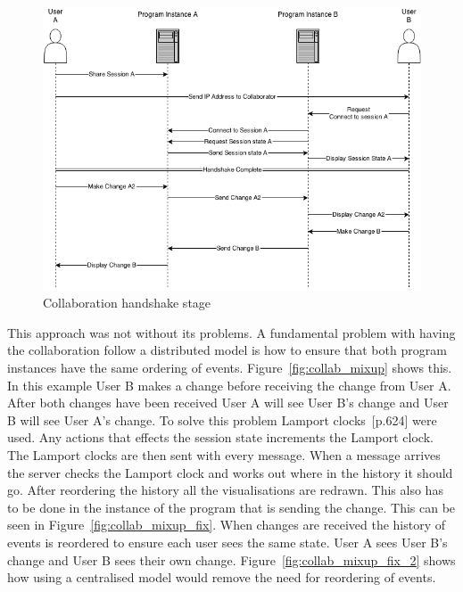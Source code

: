 \begin{figure}[h!]
    \centering
    \includegraphics[width=\textwidth]{images/minf_collab_diagram.png}
    \caption{Collaboration handshake stage}
    \label{fig:collab_handshake}
\end{figure}

This approach was not without its problems.  A fundamental problem with having the collaboration follow a distributed model is how to ensure that both program instances have the same ordering of events.  Figure~\ref{fig:collab_mixup} shows this.  In this example User B makes a change before receiving the change from User A.  After both changes have been received User A will see User B's change and User B will see User A's change.  To solve this problem Lamport clocks~\cite{coularis}[p.624] were used.  Any actions that effects the session state increments the Lamport clock. The Lamport clocks are then sent with every message.  When a message arrives the server checks the Lamport clock and works out where in the history it should go.  After reordering the history all the visualisations are redrawn.  This also has to be done in the instance of the program that is sending the change.  This can be seen in Figure~\ref{fig:collab_mixup_fix}.  When changes are received the history of events is reordered to ensure each user sees the same state.  User A sees User B's change and User B sees their own change.  Figure~\ref{fig:collab_mixup_fix_2} shows how using a centralised model would remove the need for reordering of events.

